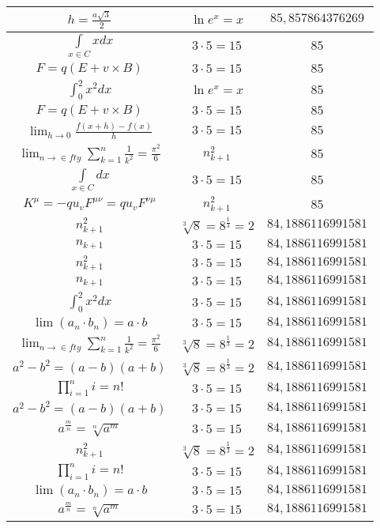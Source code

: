 \documentclass{article}
\begin{document}
\begin{flushleft}
\begin{longtable}{|c|c|c|}
$h=\frac{a\sqrt{3}}{2}$ & $\ln e^x=x$ & $85,857864376269$ \\ \hline 
$\int \limits_{x\in C}xdx$ & $3\cdot 5=15$ & $85$ \\ \hline 
$F=q\left(E+v\times B\right)$ & $3\cdot 5=15$ & $85$ \\ \hline 
$\int _0^2x^2dx$ & $\ln e^x=x$ & $85$ \\ \hline 
$F=q\left(E+v\times B\right)$ & $3\cdot 5=15$ & $85$ \\ \hline 
$\lim_{h\to0}\frac{f(x+h)-f(x)}{h}$ & $3\cdot 5=15$ & $85$ \\ \hline 
$\lim_{n\to\in fty}\sum_{k=1}^n\frac{1}{k^2}=\frac{\pi^2}{6}$ & $n_{k+1}^2$ & $85$ \\ \hline 
$\int \limits_{x\in C}dx$ & $3\cdot 5=15$ & $85$ \\ \hline 
$K^\mu=-qu_vF^{\mu\nu}=qu_vF^{\nu\mu}$ & $n_{k+1}^2$ & $85$ \\ \hline 
$n_{k+1}^2$ & $\sqrt[3]{8}=8^{\frac{1}{3}}=2$ & $84,1886116991581$ \\ \hline 
$n_{k+1}$ & $3\cdot 5=15$ & $84,1886116991581$ \\ \hline 
$n_{k+1}^2$ & $3\cdot 5=15$ & $84,1886116991581$ \\ \hline 
$n_{k+1}$ & $3\cdot 5=15$ & $84,1886116991581$ \\ \hline 
$\int _0^2x^2dx$ & $3\cdot 5=15$ & $84,1886116991581$ \\ \hline 
$\lim\left(a_n\cdot b_n\right)=a\cdot b$ & $3\cdot 5=15$ & $84,1886116991581$ \\ \hline 
$\lim_{n\to\in fty}\sum_{k=1}^n\frac{1}{k^2}=\frac{\pi^2}{6}$ & $\sqrt[3]{8}=8^{\frac{1}{3}}=2$ & $84,1886116991581$ \\ \hline 
$a^2-b^2=(a-b)(a+b)$ & $\sqrt[3]{8}=8^{\frac{1}{3}}=2$ & $84,1886116991581$ \\ \hline 
$\prod_{i=1}^ni=n!$ & $3\cdot 5=15$ & $84,1886116991581$ \\ \hline 
$a^2-b^2=(a-b)(a+b)$ & $3\cdot 5=15$ & $84,1886116991581$ \\ \hline 
$a^{\frac{m}{n}}=\sqrt[n]{a^{m}}$ & $3\cdot 5=15$ & $84,1886116991581$ \\ \hline 
$n_{k+1}^2$ & $\sqrt[3]{8}=8^{\frac{1}{3}}=2$ & $84,1886116991581$ \\ \hline 
$\prod_{i=1}^ni=n!$ & $3\cdot 5=15$ & $84,1886116991581$ \\ \hline 
$\lim\left(a_n\cdot b_n\right)=a\cdot b$ & $3\cdot 5=15$ & $84,1886116991581$ \\ \hline 
$a^{\frac{m}{n}}=\sqrt[n]{a^{m}}$ & $3\cdot 5=15$ & $84,1886116991581$ \\ \hline 

\end{longtable}
\end{flushleft}
\end{document}
